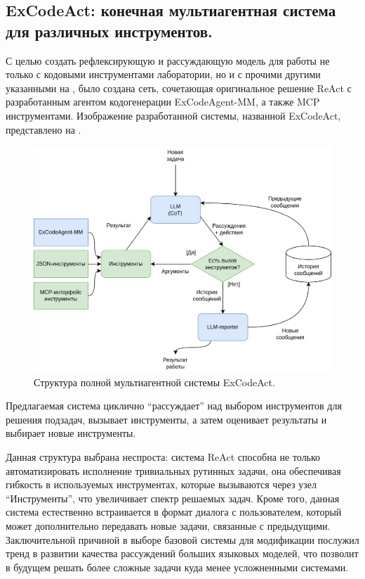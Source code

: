 \begin{enumerate}
\section{ExCodeAct: конечная мультиагентная система для различных инструментов.} \label{ch3:sec2}

С целью создать рефлексирующую и рассуждающую модель для работы не только с кодовыми 
инструментами лаборатории, но и с прочими другими указанными на ,
было создана сеть, сочетающая оригинальное решение ReAct с разработанным агентом
кодогенерации ExCodeAgent-MM, а также MCP инструментами. Изображение разработанной системы,
названной ExCodeAct, представлено на .

\begin{figure}
    \center
	\includegraphics[scale=0.24]{sources/ExCodeAct-MM.png}
	\caption{Структура полной мультиагентной системы ExCodeAct.} 
	\label{fig:ch3:excodeact}  
\end{figure}

Предлагаемая система циклично ``рассуждает'' над выбором инструментов для решения подзадач,
вызывает инструменты, а затем оценивает результаты и выбирает новые инструменты.

Данная структура выбрана неспроста: система ReAct способна не только автоматизировать 
исполнение тривиальных рутинных задачи, она обеспечивая гибкость в используемых инструментах,
которые вызываются через узел ``Инструменты'', что увеличивает спектр решаемых задач. 
Кроме того, данная система естественно встраивается в формат диалога
с пользователем, который может дополнительно передавать новые задачи, 
связанные с предыдущими. 
Заключительной причиной в выборе базовой системы для модификации послужил тренд
в развитии качества рассуждений больших языковых моделей, 
что позволит в будущем решать более сложные задачи куда менее усложненными системами.


\end{enumerate}
